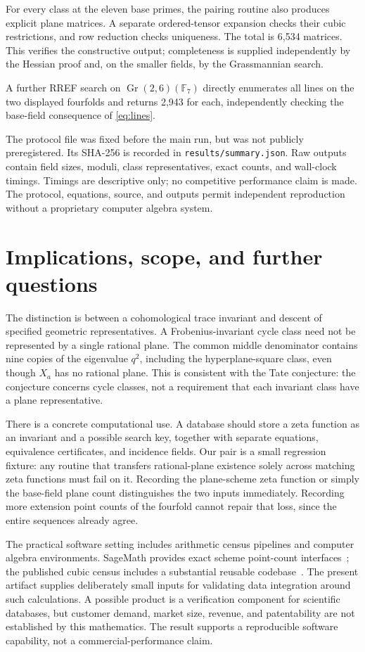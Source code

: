 \documentclass[11pt]{article}
\theoremstyle{remark}\newtheorem{remark}[theorem]{Remark}
\newcommand{\F}{\mathbb F}\newcommand{\PP}{\mathbb P}\newcommand{\Z}{\mathbb Z}
\begin{document}
For every class at the eleven base primes, the pairing routine also produces explicit plane matrices. A separate ordered-tensor expansion checks their cubic restrictions, and row reduction checks uniqueness. The total is 6,534 matrices. This verifies the constructive output; completeness is supplied independently by the Hessian proof and, on the smaller fields, by the Grassmannian search.

A further RREF search on $\operatorname{Gr}(2,6)(\F_7)$ directly enumerates all lines on the two displayed fourfolds and returns 2,943 for each, independently checking the base-field consequence of \eqref{eq:lines}.

The protocol file was fixed before the main run, but was not publicly preregistered. Its SHA-256 is recorded in \texttt{results/summary.json}. Raw outputs contain field sizes, moduli, class representatives, exact counts, and wall-clock timings. Timings are descriptive only; no competitive performance claim is made. The protocol, equations, source, and outputs permit independent reproduction without a proprietary computer algebra system.

\section{Implications, scope, and further questions}
The distinction is between a cohomological trace invariant and descent of specified geometric representatives. A Frobenius-invariant cycle class need not be represented by a single rational plane. The common middle denominator contains nine copies of the eigenvalue $q^2$, including the hyperplane-square class, even though $X_a$ has no rational plane. This is consistent with the Tate conjecture: the conjecture concerns cycle classes, not a requirement that each invariant class have a plane representative.

There is a concrete computational use. A database should store a zeta function as an invariant and a possible search key, together with separate equations, equivalence certificates, and incidence fields. Our pair is a small regression fixture: any routine that transfers rational-plane existence solely across matching zeta functions must fail on it. Recording the plane-scheme zeta function or simply the base-field plane count distinguishes the two inputs immediately. Recording more extension point counts of the fourfold cannot repair that loss, since the entire sequences already agree.

The practical software setting includes arithmetic census pipelines and computer algebra environments. SageMath provides exact scheme point-count interfaces~\cite{sage}; the published cubic census includes a substantial reusable codebase~\cite{akpw}. The present artifact supplies deliberately small inputs for validating data integration around such calculations. A possible product is a verification component for scientific databases, but customer demand, market size, revenue, and patentability are not established by this mathematics. The result supports a reproducible software capability, not a commercial-performance claim.
\end{document}
